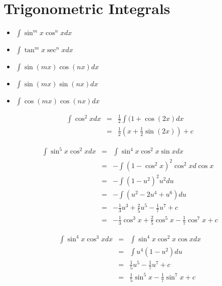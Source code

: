 \section{Trigonometric Integrals}
\begin{notn}
\begin{itemize}
\item $\displaystyle \int \sin^m x \cos^n x dx$\\
\item $\displaystyle \int \tan^m x \sec^n x dx$
\item $\displaystyle \int \sin (mx) \cos (nx) dx$
\item $\displaystyle \int \sin (mx) \sin(nx) dx$
\item $\displaystyle \int \cos (mx) \cos (nx) dx$
\end{itemize}
\end{notn}
\begin{eg}
$$\begin{array}{rcl}
\displaystyle \int \cos^2 x dx & = & \displaystyle \frac{1}{2} \int(1+ \cos(2x) dx\\
& = & \displaystyle \frac{1}{2} ( x + \frac{1}{2} \sin(2x) ) + c
\end{array}$$
\end{eg}
\begin{eg}
$$\begin{array}{rcl}
\displaystyle \int \sin^5x \cos^2 x dx & = & \displaystyle \int \sin^4 x \cos^2 x \sin x dx\\
& = & \displaystyle - \int (1- \cos^2 x)^2 \cos^2 x d\cos x\\
& = & \displaystyle - \int (1- u^2)^2 u^2 du\\
& = & \displaystyle - \int (u^2 - 2u^4 + u^6 ) du\\
& = & \displaystyle -\frac{1}{3} u^3 + \frac{2}{5} u^5 - \frac{1}{7} u^7 + c\\
& = & \displaystyle -\frac{1}{3} \cos^3 x + \frac{2}{5} \cos^5 x - \frac{1}{7} \cos^7 x + c 
\end{array}$$
\end{eg}
\begin{eg}
$$\begin{array}{rcl}
\displaystyle \int \sin^4 x \cos^3 x dx & = & \displaystyle \int \sin^4 x \cos^2x \cos x dx\\
& = & \displaystyle \int u^4 (1-u^2) du\\
& = & \displaystyle \frac{1}{5} u^5 - \frac{1}{7} u^7 + c\\
& = & \displaystyle \frac{1}{5} \sin^5 x - \frac{1}{7} \sin^7 x + c
\end{array}$$
\end{eg}
